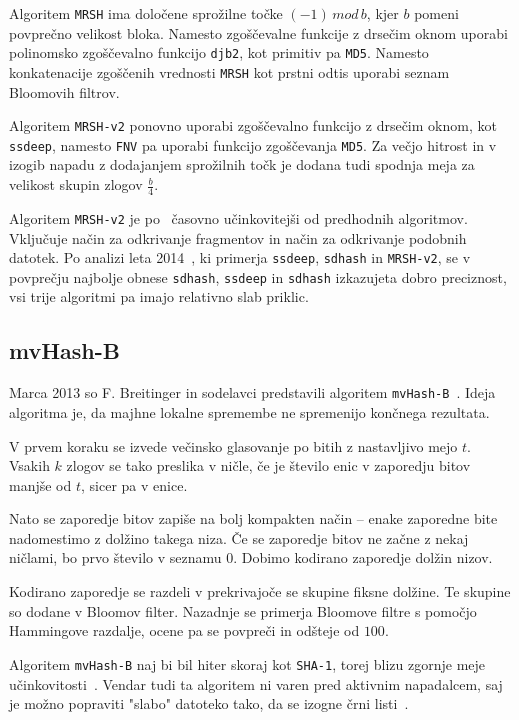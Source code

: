 \documentclass{acm_proc_article-sp}
\begin{document}
Algoritem \texttt{MRSH} ima določene sprožilne točke $(-1)\,mod\,b$, kjer $b$ pomeni povprečno velikost bloka. Namesto zgoščevalne funkcije z drsečim oknom uporabi polinomsko zgoščevalno funkcijo \texttt{djb2}, kot primitiv pa \texttt{MD5}. Namesto konkatenacije zgoščenih vrednosti \texttt{MRSH} kot prstni odtis uporabi seznam Bloomovih filtrov. 

Algoritem \texttt{MRSH-v2} ponovno uporabi zgoščevalno funkcijo z drsečim oknom, kot \texttt{ssdeep}, namesto \texttt{FNV} pa uporabi funkcijo zgoščevanja \texttt{MD5}. Za večjo hitrost in v izogib napadu z dodajanjem sprožilnih točk je dodana tudi spodnja meja za velikost skupin zlogov $\frac{b}{4}$. 

Algoritem \texttt{MRSH-v2} je po~\cite{mrsh-v2} časovno učinkovitejši od predhodnih algoritmov. Vključuje način za odkrivanje fragmentov in način za odkrivanje podobnih datotek. Po analizi leta 2014~\cite{breitinger2014}, ki primerja \texttt{ssdeep}, \texttt{sdhash} in \texttt{MRSH-v2}, se v povprečju najbolje obnese \texttt{sdhash}, \texttt{ssdeep} in \texttt{sdhash} izkazujeta dobro preciznost, vsi trije algoritmi pa imajo relativno slab priklic.

\subsection{mvHash-B}
Marca 2013 so F. Breitinger in sodelavci predstavili algoritem \texttt{mvHash-B}~\cite{mvhash-b}. Ideja algoritma je, da majhne lokalne spremembe ne spremenijo končnega rezultata. 

V prvem koraku se izvede večinsko glasovanje po bitih z nastavljivo mejo $t$. Vsakih $k$ zlogov se tako preslika v ničle, če je število enic v zaporedju bitov manjše od $t$, sicer pa v enice.

Nato se zaporedje bitov zapiše na bolj kompakten način -- enake zaporedne bite nadomestimo z dolžino takega niza. Če se zaporedje bitov ne začne z nekaj ničlami, bo prvo število v seznamu 0. Dobimo kodirano zaporedje dolžin nizov.

Kodirano zaporedje se razdeli v prekrivajoče se skupine fiksne dolžine. Te skupine so dodane v Bloomov filter.
Nazadnje se primerja Bloomove filtre s pomočjo Hammingove razdalje, ocene pa se povpreči in odšteje od $100$. 

Algoritem \texttt{mvHash-B} naj bi bil hiter skoraj kot \texttt{SHA-1}, torej blizu zgornje meje učinkovitosti~\cite{mvhash-b}. Vendar tudi ta algoritem ni varen pred aktivnim napadalcem, saj je možno popraviti "slabo" datoteko tako, da se izogne črni listi~\cite{chang2016security}.
\end{document}
